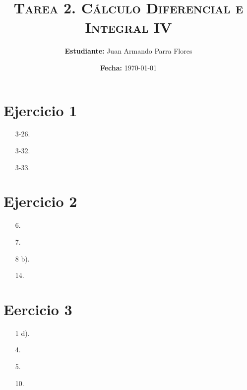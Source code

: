 \documentclass[11pt]{article}
\title{
    \textsc{
        \textbf{Tarea 2.} Cálculo Diferencial e Integral IV
    }
}
\author{
    \textbf{Estudiante:} Juan Armando Parra Flores
}
\date{
    \textbf{Fecha:} \today
}
\begin{document}
    \maketitle

    \section*{Ejercicio 1}
    \begin{itemize}
        \item[3-26.]   
            
        \item[3-32.]   
            
        \item[3-33.]   
            
    \end{itemize}
    \section*{Ejercicio 2}
    \begin{itemize}
        \item[6.]
            
        \item[7.]
            
        \item[8 b).]
            
        \item[14.]
            
    \end{itemize}
    \section*{Eercicio 3}
    \begin{itemize}
        \item[1 d).]
            
        \item[4.]
            
        \item[5.]
            
        \item[10.]
            
    \end{itemize}
\end{document}

